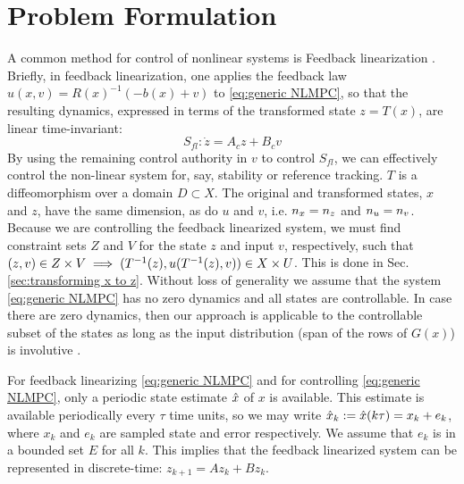 \section{Problem Formulation} 
\label{sec:formulation}
A common method for control of nonlinear systems is Feedback linearization \cite{khalil}. 
Briefly, in feedback linearization, one applies the feedback law $u(x,v) = R(x)^{-1}(-b(x)+v)$ to \eqref{eq:generic NLMPC}, so that the resulting dynamics, expressed in terms of the transformed state $z = T(x)$, are linear time-invariant:
\begin{equation}
\label{eq:LTI_fb_lin}
S_{fl}: \dot{z} = A_cz + B_cv
\end{equation}
By using the remaining control authority in $v$ to control $S_{fl}$, we can effectively control the non-linear system for, say, stability or reference tracking.
$T$ is a diffeomorphism \cite{khalil} over a domain $D \subset X$.
The original and transformed states, $x$ and $z$, have the same dimension, as do $u$ and $v$, i.e. $n_x = n_z$ and $n_u = n_v$.
Because we are controlling the feedback linearized system, we must find constraint sets $Z$ and $V$ for the state $z$ and input $v$, respectively, such that $(z,v) \in Z\times V \implies (T^{-1}(z), u(T^{-1}(z), v)) \in X \times U$.
This is done in Sec. \ref{sec:transforming x to z}.
Without loss of generality we assume that the system \eqref{eq:generic NLMPC} has no zero dynamics \cite{khalil} and all states are controllable. In case there are zero dynamics, then our approach is applicable to the controllable subset of the states as long as the input distribution (span of the rows of $G(x)$) is involutive \cite{khalil}.

For feedback linearizing \eqref{eq:generic NLMPC} and for controlling \eqref{eq:generic NLMPC}, only a periodic state estimate $\hat{x}$ of $x$ is available.
This estimate is available periodically every $\tau$ time units, so we may write $\hat{x}_{k} := \hat{x}(k\tau) = x_k + e_k$, where $x_k$ and $e_k$ are sampled state and error respectively.
We assume that $e_k$ is in a bounded set $E$ for all $k$.
This implies that the feedback linearized system can be represented in discrete-time: $z_{k+1} = Az_k + B z_k$.

